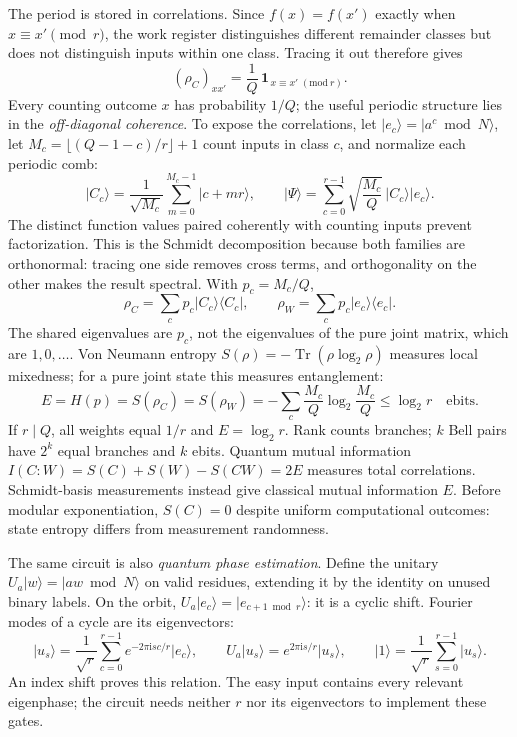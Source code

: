 \documentclass[11pt,a4paper]{article}
\newcommand{\ket}[1]{\lvert #1\rangle}
\newcommand{\bra}[1]{\langle #1\rvert}
\newcommand{\Tr}{\operatorname{Tr}}
\newcommand{\ii}{\mathrm{i}}
\begin{document}
The period is stored in correlations. Since \(f(x)=f(x')\) exactly when \(x\equiv x'\pmod r\), the work register distinguishes different remainder classes but does not distinguish inputs within one class. Tracing it out therefore gives
\[
(\rho_C)_{xx'}=\frac1Q\,\mathbf1_{\,x\equiv x'\;(\mathrm{mod}\ r)}.
\]
Every counting outcome \(x\) has probability \(1/Q\); the useful periodic structure lies in the \emph{off-diagonal coherence}. To expose the correlations, let \(\ket{e_c}=\ket{a^c\bmod N}\), let \(M_c=\lfloor(Q-1-c)/r\rfloor+1\) count inputs in class \(c\), and normalize each periodic comb:
\[
\ket{C_c}=\frac1{\sqrt{M_c}}\sum_{m=0}^{M_c-1}\ket{c+mr},
\qquad
\ket\Psi=\sum_{c=0}^{r-1}\sqrt{\frac{M_c}{Q}}\,\ket{C_c}\ket{e_c}.
\]
The distinct function values paired coherently with counting inputs prevent factorization. This is the Schmidt decomposition because both families are orthonormal: tracing one side removes cross terms, and orthogonality on the other makes the result spectral. With \(p_c=M_c/Q\),
\[
\rho_C=\sum_cp_c\ket{C_c}\bra{C_c},
\qquad
\rho_W=\sum_cp_c\ket{e_c}\bra{e_c}.
\]
The shared eigenvalues are \(p_c\), not the eigenvalues of the pure joint matrix, which are \(1,0,\ldots\). Von Neumann entropy \(S(\rho)=-\Tr(\rho\log_2\rho)\) measures local mixedness; for a pure joint state this measures entanglement:
\[
E=H(p)=S(\rho_C)=S(\rho_W)
=-\sum_c\frac{M_c}{Q}\log_2\frac{M_c}{Q}\le\log_2r\quad\text{ebits}.
\]
If \(r\mid Q\), all weights equal \(1/r\) and \(E=\log_2r\). Rank counts branches; \(k\) Bell pairs have \(2^k\) equal branches and \(k\) ebits. Quantum mutual information \(I(C{:}W)=S(C)+S(W)-S(CW)=2E\) measures total correlations. Schmidt-basis measurements instead give classical mutual information \(E\). Before modular exponentiation, \(S(C)=0\) despite uniform computational outcomes: state entropy differs from measurement randomness.

\newpage
The same circuit is also \emph{quantum phase estimation}. Define the unitary \(U_a\ket w=\ket{aw\bmod N}\) on valid residues, extending it by the identity on unused binary labels. On the orbit, \(U_a\ket{e_c}=\ket{e_{c+1\bmod r}}\): it is a cyclic shift. Fourier modes of a cycle are its eigenvectors:
\[
\ket{u_s}=\frac1{\sqrt r}\sum_{c=0}^{r-1}e^{-2\pi\ii sc/r}\ket{e_c},
\qquad
U_a\ket{u_s}=e^{2\pi\ii s/r}\ket{u_s},
\qquad
\ket1=\frac1{\sqrt r}\sum_{s=0}^{r-1}\ket{u_s}.
\]
An index shift proves this relation. The easy input contains every relevant eigenphase; the circuit needs neither \(r\) nor its eigenvectors to implement these gates.
\end{document}
